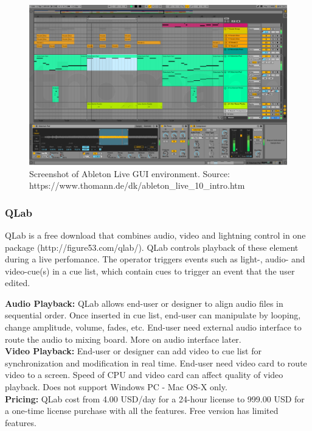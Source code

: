 \begin{figure}[H]
\centering
\includegraphics[scale=0.4]{./pictures/ableton.png}
\caption{Screenshot of Ableton Live GUI environment. Source: https://www.thomann.de/dk/ableton\_live\_10\_intro.htm}
\label{fig:ableton.png}
\end{figure}

\subsubsection{QLab}
QLab is a free download that combines audio, video and lightning control in one package (http://figure53.com/qlab/). QLab controls playback of these element during a live perfomance. The operator triggers events such as light-, audio- and video-cue(s) in a cue list, which contain cues to trigger an event that the user edited. \newline

\textbf{Audio Playback:} QLab allows end-user or designer to align audio files in sequential order. Once inserted in cue list, end-user can manipulate by looping, change amplitude, volume, fades, etc. End-user need external audio interface to route the audio to mixing board. More on audio interface later. \\

\textbf{Video Playback:} End-user or designer can add video to cue list for synchronization and modification in real time. End-user need video card to route video to a screen. Speed of CPU and video card can affect quality of video playback. Does not support Windows PC - Mac OS-X only. \\

\textbf{Pricing:} QLab cost from 4.00 USD/day for a 24-hour license to 999.00 USD for a one-time license purchase with all the features. Free version has limited features.

